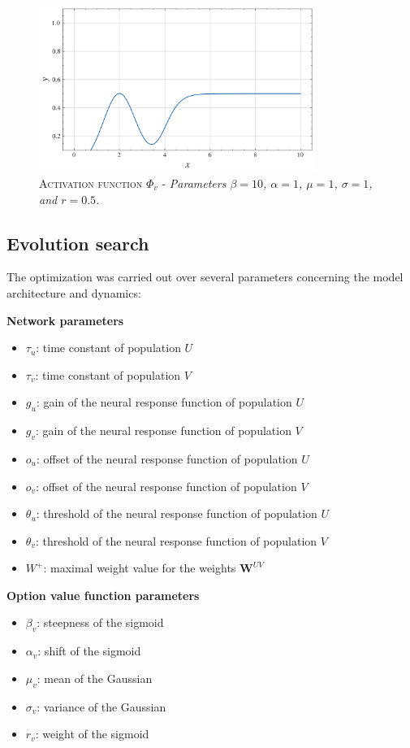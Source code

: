 \begin{figure}[H]
    \centering
    \includegraphics[width=0.8\textwidth]{figures/gaussian_sigmoid.png}
    \caption{\textsc{Activation function $\Phi_{v}$} - \textit{Parameters $\beta=10$, $\alpha=1$, $\mu=1$, $\sigma=1$, and $r=0.5$.}}
    \label{fig:gau_sigm}
\end{figure}


\subsection{Evolution search}
The optimization was carried out over several parameters concerning the model architecture and dynamics:

\noindent \textbf{Network parameters}
\begin{itemize}
    \item $\tau_{u}$: time constant of population $U$
    \item $\tau_{v}$: time constant of population $V$
    \item $g_{u}$: gain of the neural response function of population $U$
    \item $g_{v}$: gain of the neural response function of population $V$
    \item $o_{u}$: offset of the neural response function of population $U$
    \item $o_{v}$: offset of the neural response function of population $V$
    \item $\theta_{u}$: threshold of the neural response function of population $U$
    \item $\theta_{v}$: threshold of the neural response function of population $V$
    \item $W^{+}$: maximal weight value for the weights $\textbf{W}^{UV}$
\end{itemize}

\noindent \textbf{Option value function parameters}
\begin{itemize}
    \item $\beta_{v}$: steepness of the sigmoid
    \item $\alpha_{v}$: shift of the sigmoid
    \item $\mu_{v}$: mean of the Gaussian
    \item $\sigma_{v}$: variance of the Gaussian
    \item $r_{v}$: weight of the sigmoid
\end{itemize}


